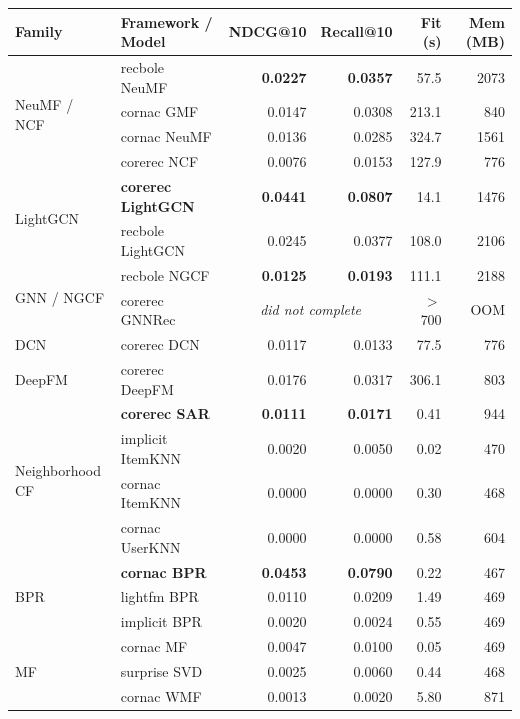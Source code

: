 \documentclass[10pt]{article}
\begin{document}
\begin{table}[h]\centering\small
\begin{tabular}{llrrrr}
\toprule
Family & Framework / Model & NDCG@10 & Recall@10 & Fit (s) & Mem (MB) \\
\midrule
\multirow{4}{*}{NeuMF / NCF}
 & recbole NeuMF        & \textbf{0.0227} & \textbf{0.0357} & 57.5 & 2073 \\
 & cornac GMF           & 0.0147 & 0.0308 & 213.1 & 840 \\
 & cornac NeuMF         & 0.0136 & 0.0285 & 324.7 & 1561 \\
 & corerec NCF          & 0.0076 & 0.0153 & 127.9 & 776 \\
\midrule
\multirow{2}{*}{LightGCN}
 & \textbf{corerec LightGCN} & \textbf{0.0441} & \textbf{0.0807} & 14.1 & 1476 \\
 & recbole LightGCN          & 0.0245 & 0.0377 & 108.0 & 2106 \\
\midrule
\multirow{2}{*}{GNN / NGCF}
 & recbole NGCF          & \textbf{0.0125} & \textbf{0.0193} & 111.1 & 2188 \\
 & corerec GNNRec        & \multicolumn{2}{c}{\emph{did not complete}} & $>$700 & OOM \\
\midrule
DCN    & corerec DCN     & 0.0117 & 0.0133 & 77.5 & 776 \\
DeepFM & corerec DeepFM  & 0.0176 & 0.0317 & 306.1 & 803 \\
\midrule
\multirow{4}{*}{Neighborhood CF}
 & \textbf{corerec SAR}  & \textbf{0.0111} & \textbf{0.0171} & 0.41 & 944 \\
 & implicit ItemKNN      & 0.0020 & 0.0050 & 0.02 & 470 \\
 & cornac ItemKNN        & 0.0000 & 0.0000 & 0.30 & 468 \\
 & cornac UserKNN        & 0.0000 & 0.0000 & 0.58 & 604 \\
\midrule
\multirow{3}{*}{BPR}
 & \textbf{cornac BPR}   & \textbf{0.0453} & \textbf{0.0790} & 0.22 & 467 \\
 & lightfm BPR           & 0.0110 & 0.0209 & 1.49 & 469 \\
 & implicit BPR          & 0.0020 & 0.0024 & 0.55 & 469 \\
\midrule
\multirow{3}{*}{MF}
 & cornac MF             & 0.0047 & 0.0100 & 0.05 & 469 \\
 & surprise SVD          & 0.0025 & 0.0060 & 0.44 & 468 \\
 & cornac WMF            & 0.0013 & 0.0020 & 5.80 & 871 \\
\midrule

\end{tabular}
\end{table}
\end{document}
